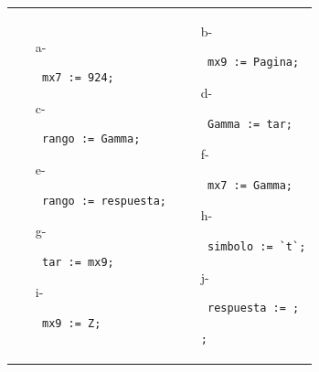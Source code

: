 \documentclass[a4paper,10pt]{article}
\begin{document}
\begin{enumerate}
\begin{tabular}{p{} p{}}
    \begin{itemize}
        \item[a-] \begin{verbatim} mx7 := 924;\end{verbatim}
        \item[c-] \begin{verbatim} rango := Gamma;\end{verbatim}
        \item[e-] \begin{verbatim} rango := respuesta;\end{verbatim}
         \item[g-] \begin{verbatim} tar := mx9;\end{verbatim}
         \item[i-] \begin{verbatim} mx9 := Z;\end{verbatim}
    \end{itemize}
&
    \begin{itemize}
       \item[b-] \begin{verbatim} mx9 := Pagina;\end{verbatim}
       \item[d-] \begin{verbatim} Gamma := tar;\end{verbatim}
        \item[f-] \begin{verbatim} mx7 := Gamma;\end{verbatim}
         \item[h-] \begin{verbatim} simbolo := `t`;\end{verbatim}
          \item[j-] \begin{verbatim} respuesta := ;\end{verbatim} \normalsize \color{green}{\textsf{ True }} \begin{verbatim};\end{verbatim}
    \end{itemize}
\\
\end{tabular}


\end{enumerate}
\end{document}
